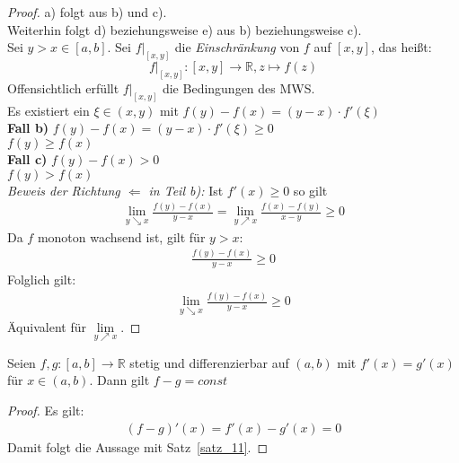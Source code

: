 \begin{proof}
	a) folgt aus b) und c). \\
	Weiterhin folgt d) beziehungsweise e) aus b) beziehungsweise c). \\
	Sei $ y > x \in [a,b]$. Sei $f|_{[x,y]}$ die \textit{Einschränkung} 
	von $f$ auf $[x,y]$, das heißt: 
	\begin{equation*}
		f|_{[x,y]} : [x,y] \rightarrow \mathbb{R}, z \mapsto f(z)
	\end{equation*}
	Offensichtlich erfüllt $f|_{[x,y]}$ die Bedingungen des MWS. \\
	Es existiert 
	ein $\xi \in (x,y)$ mit $f(y)-f(x) = (y-x)\cdot f'(\xi)$\\
	\textbf{Fall b)} $f(y)-f(x) = (y-x)\cdot f'(\xi) \geq 0$ \\
	\hspace*{1.5cm} $f(y) \geq f(x) $ \\
	\textbf{Fall c)} $f(y)-f(x) > 0$ \\
	\hspace*{1.5cm}$f(y) > f(x)$ \\
	\emph{Beweis der Richtung $\Leftarrow$ in Teil b):} Ist $f'(x) \geq 0$ so gilt
	\begin{align*}
		\lim\limits_{y \searrow x}{\frac{f(y)-f(x)}{y-x}}
		=\lim\limits_{y \nearrow x}{\frac{f(x) -f(y)}{x-y}} \geq 0
	\end{align*}
	Da $f$ monoton wachsend ist, gilt für $y > x$: 
	\begin{align*}
		\frac{f(y)-f(x)}{y-x} \geq 0
	\end{align*}	 
	Folglich gilt: 
	\begin{align*}
		\lim\limits_{y \searrow x}{\frac{f(y)-f(x)}{y-x} } \geq 0
	\end{align*}
	Äquivalent für $\lim\limits_{y \nearrow x}{ }$. 
\end{proof}


\begin{Korollar}{
	Seien $f,g : [a,b] \rightarrow \mathbb{R}$ stetig und differenzierbar auf
	$(a,b)$ mit $f'(x) = g'(x)$ für $x \in (a,b)$. Dann gilt $f-g = const$
}\end{Korollar}

\begin{proof}
	Es gilt: 
	\begin{align*}
		(f-g)'(x) = f'(x)-g'(x) = 0
	\end{align*}
	Damit folgt die Aussage mit Satz~\ref{satz_11}.
\end{proof}

